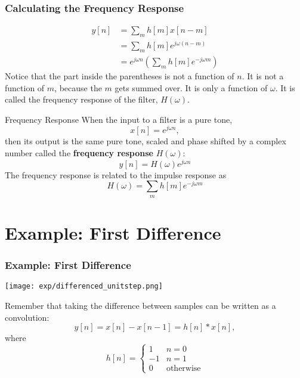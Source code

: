 \documentclass{beamer}
\begin{document}
\begin{frame}
  \frametitle{Calculating the Frequency Response}

  
  \begin{align*}
    y[n] &= \sum_m h[m] x[n-m]\\
    &= \sum_m h[m] e^{j\omega (n-m)}\\
    &= e^{j\omega n} \left(\sum_m h[m] e^{-j\omega m}\right)
  \end{align*}
  Notice that the part inside the parentheses is not a function of
  $n$.  It is not a function of $m$, because the $m$ gets summed over.
  It is only a function of $\omega$.  It is called the frequency
  response of the filter, $H(\omega)$.
\end{frame}

\begin{frame}
  \begin{block}{Frequency Response}
    When the input to a filter is a pure tone,
    \[
    x[n] =e^{j\omega n},
    \]
    then its output is the same pure tone, scaled and phase shifted by  a  complex number
    called the {\bf frequency response} $H(\omega)$:
    \[
    y[n] = H(\omega) e^{j\omega n}
    \]
    The frequency response is related to the impulse response as
    \[
    H(\omega) = \sum_m h[m]e^{-j\omega m}
    \]
  \end{block}
\end{frame}

\section[Example]{Example: First Difference}
\setcounter{subsection}{1}

\begin{frame}
  \frametitle{Example: First Difference}

  \centerline{\texttt{[image: exp/differenced\_unitstep.png]}}
  
  Remember that taking the difference between samples can be written as a convolution:
  \[ y[n] = x[n]-x[n-1]= h[n]\ast x[n],\]
  where
  \[
  h[n]=\begin{cases}1 & n=0\\-1&n=1\\0&\mbox{otherwise}\end{cases}
  \]
\end{frame}
\end{document}
